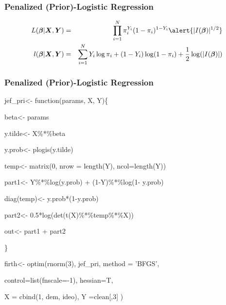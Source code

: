 \documentclass{beamer}
\begin{document}
\begin{frame}
\frametitle{Penalized (Prior)-Logistic Regression}

\begin{eqnarray}
L(\boldsymbol{\beta}| \boldsymbol{X}, \boldsymbol{Y} ) & = & \prod_{i=1}^{N} \pi_{i}^{Y_{i}} (1- \pi_{i})^{1-Y_{i}}\alert{|I(\boldsymbol{\beta})|^{1/2}} \nonumber \\
l(\boldsymbol{\beta}| \boldsymbol{X}, \boldsymbol{Y} ) & = & \sum_{i=1}^{N} Y_{i} \log \pi_{i} + (1-Y_{i} ) \log (1- \pi_{i}) + \frac{1}{2}\log(|I(\boldsymbol{\beta})|) \nonumber 
\end{eqnarray}



\end{frame}


\begin{frame}
\frametitle{Penalized (Prior)-Logistic Regression}

\begin{semiverbatim}
jef\_pri<- function(params, X, Y)\{

	\hspace{0.25in}	beta<- params

	\hspace{0.25in}	y.tilde<- X\%*\%beta

	\hspace{0.25in}	y.prob<- plogis(y.tilde)

	\hspace{0.25in}	temp<- matrix(0, nrow = length(Y), ncol=length(Y))

	\hspace{0.25in}	part1<- Y\%*\%log(y.prob) + (1-Y)\%*\%log(1- y.prob)

	\hspace{0.25in}	diag(temp)<- y.prob*(1-y.prob)

	\hspace{0.25in}	part2<- 0.5*log(det(t(X)\%*\%temp\%*\%X))

	\hspace{0.25in}	out<- part1 + part2

	\}

firth<- optim(rnorm(3), jef\_pri, method = 'BFGS', 

control=list(fnscale=-1), hessian=T, 

X = cbind(1, dem, ideo), Y =clean[,3] )	


\end{semiverbatim}


\end{frame}
\end{document}
